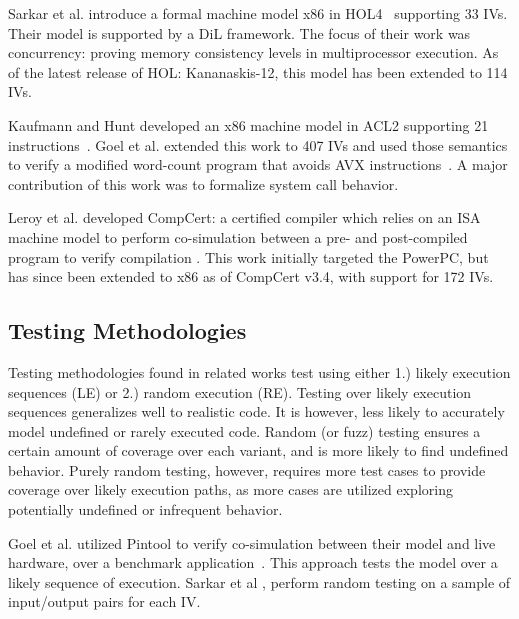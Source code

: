 Sarkar et al. introduce a formal machine model x86 in HOL4~\cite{sarkar2009semantics} supporting 33 IVs. 
Their model is supported by a DiL framework.
The focus of their work was concurrency: proving memory consistency levels in multiprocessor execution. 
As of the latest release of HOL: Kananaskis-12, this model has been extended to 114 IVs. 

Kaufmann and Hunt developed an x86 machine model in ACL2 supporting 21 instructions~\cite{hunt2012towards,kaufmann2013computer}.
Goel et al. extended this work to 407 IVs and used those semantics to verify a modified word-count program that avoids AVX instructions~\cite{Goel14, goel2017engineering}. 
A major contribution of this work was to formalize system call behavior.

Leroy et al. developed CompCert: a certified compiler which relies on an ISA machine model to perform co-simulation between a pre- and post-compiled program to verify compilation \cite{Leroy-backend, leroy2009formal, leroy2012compcert}. 
This work initially targeted the PowerPC, but has since been extended to x86 as of CompCert v3.4, with support for 172 IVs. 


\subsection{Testing Methodologies}

Testing methodologies found in related works test using either 1.) likely execution sequences (LE) or 2.) random execution (RE). Testing over likely execution sequences generalizes well to realistic code. It is however, less likely to accurately model undefined or rarely executed code. Random (or fuzz) testing ensures a certain amount of coverage over each variant, and is more likely to find undefined behavior. Purely random testing, however, requires more test cases to provide coverage over likely execution paths, as more cases are utilized exploring potentially undefined or infrequent behavior. %

Goel et al. utilized Pintool to verify co-simulation between their model and live hardware, over a benchmark application~\cite{Goel14}. This approach tests the model over a likely sequence of execution. Sarkar et al  \cite{sarkar2009semantics}, perform random testing on a sample of input/output pairs for each IV. 

